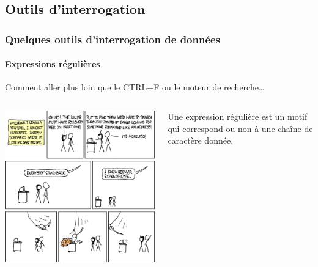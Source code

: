 \documentclass[ignorenonframetext]{beamer}
\begin{document}

\subsection{Outils d'interrogation}


\begin{frame}[fragile]
\frametitle{Quelques outils d'interrogation de données}
\framesubtitle{Expressions régulières}
	
	Comment aller plus loin que le CTRL+F ou le moteur de recherche…
	
	\begin{columns}
		\begin{column}{0.45\textwidth}
			
			\includegraphics[width=\textwidth]{img/regular_expressions.png}
					
		\end{column}
		\begin{column}{0.53\textwidth}
		
		Une expression régulière est un motif qui correspond ou non à une chaîne de caractère donnée.
		

\end{column}
\end{columns}
\end{frame}
\end{document}
